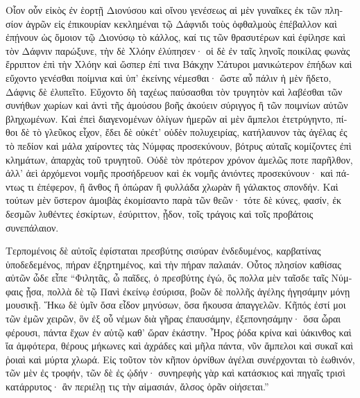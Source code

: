 \documentclass{book}
\begin{document}
\begin{pairs}
\begin{Leftside}
\begin{greek}
  Οἷον οὖν εἰκὸς ἐν ἑορτῇ Διονύσου καὶ οἴνου γενέσεως αἱ μὲν γυναῖκες ἐκ τῶν πλησίον ἀγρῶν εἰς ἐπικουρίαν κεκλημέναι τῷ Δάφνιδι τοὺς ὀφθαλμοὺς ἐπέβαλλον καὶ ἐπῄνουν ὡς ὅμοιον τῷ Διονύσῳ τὸ κάλλος, καί τις τῶν θρασυτέρων καὶ ἐφίλησε καὶ τὸν Δάφνιν παρώξυνε, τὴν δὲ Χλόην ἐλύπησεν·  οἱ δὲ ἐν ταῖς ληνοῖς ποικίλας φωνὰς ἔρριπτον ἐπὶ τὴν Χλόην καὶ ὥσπερ ἐπί τινα Βάκχην Σάτυροι μανικώτερον ἐπήδων καὶ εὔχοντο γενέσθαι ποίμνια καὶ ὑπ’ ἐκείνης νέμεσθαι· ὥστε αὖ πάλιν ἡ μὲν ἥδετο, Δάφνις δὲ ἐλυπεῖτο.  Εὔχοντο δὴ ταχέως παύσασθαι τὸν τρυγητὸν καὶ λαβέσθαι τῶν συνήθων χωρίων καὶ ἀντὶ τῆς ἀμούσου βοῆς ἀκούειν σύριγγος ἢ τῶν ποιμνίων αὐτῶν βληχωμένων.  Καὶ ἐπεὶ διαγενομένων ὀλίγων ἡμερῶν αἱ μὲν ἄμπελοι ἐτετρύγηντο, πίθοι δὲ τὸ γλεῦκος εἶχον, ἔδει δὲ οὐκέτ’ οὐδὲν πολυχειρίας, κατήλαυνον τὰς ἀγέλας ἐς τὸ πεδίον καὶ μάλα χαίροντες τὰς Νύμφας προσεκύνουν, βότρυς αὐταῖς κομίζοντες ἐπὶ κλημάτων, ἀπαρχὰς τοῦ τρυγητοῦ.  Οὐδὲ τὸν πρότερον χρόνον ἀμελῶς ποτε παρῆλθον, ἀλλ’ ἀεὶ ἀρχόμενοι νομῆς προσήδρευον καὶ ἐκ νομῆς ἀνιόντες προσεκύνουν· καὶ πάντως τι ἐπέφερον, ἢ ἄνθος ἢ ὀπώραν ἢ φυλλάδα χλωρὰν ἢ γάλακτος σπονδήν. Καὶ τούτων μὲν ὕστερον ἀμοιβὰς ἐκομίσαντο παρὰ τῶν θεῶν·  τότε δὲ κύνες, φασίν, ἐκ δεσμῶν λυθέντες ἐσκίρτων, ἐσύριττον, ᾖδον, τοῖς τράγοις καὶ τοῖς προβάτοις συνεπάλαιον.
\pend


  Τερπομένοις δὲ αὐτοῖς ἐφίσταται πρεσβύτης σισύραν ἐνδεδυμένος, καρβατίνας ὑποδεδεμένος, πήραν ἐξηρτημένος, καὶ τὴν πήραν παλαιάν. Οὗτος πλησίον καθίσας αὐτῶν ὧδε εἶπε “Φιλητᾶς,  ὦ παῖδες, ὁ πρεσβύτης ἐγώ, ὃς πολλα μὲν ταῖσδε ταῖς Νύμφαις ᾖσα, πολλὰ δὲ τῷ Πανὶ ἐκείνῳ ἐσύρισα, βοῶν δὲ πολλῆς ἀγέλης ἡγησάμην μόνῃ μουσικῇ. Ἥκω δὲ ὑμῖν ὅσα εἶδον μηνύσων, ὅσα ἤκουσα ἀπαγγελῶν.  Κῆπός ἐστί μοι τῶν ἐμῶν χειρῶν, ὃν ἐξ οὗ νέμων διὰ γῆρας ἐπαυσάμην, ἐξεπονησάμην· ὅσα ὧραι φέρουσι, πάντα ἔχων ἐν αὑτῷ καθ’ ὥραν ἑκάστην.  Ἦρος ῥόδα κρίνα καὶ ὑάκινθος καὶ ἴα ἀμφότερα, θέρους μήκωνες καὶ ἀχράδες καὶ μῆλα πάντα, νῦν ἄμπελοι καὶ συκαῖ καὶ ῥοιαὶ καὶ μύρτα χλωρά.  Εἰς τοῦτον τὸν κῆπον ὀρνίθων ἀγέλαι συνέρχονται τὸ ἑωθινόν, τῶν μὲν ἐς τροφήν, τῶν δὲ ἐς ᾠδήν· συνηρεφὴς γὰρ καὶ κατάσκιος καὶ πηγαῖς τρισὶ κατάρρυτος· ἂν περιέλῃ τις τὴν αἱμασιάν, ἄλσος ὁρᾶν οἰήσεται.”
\pend



\end{greek}
\end{Leftside}
\end{pairs}
\end{document}
